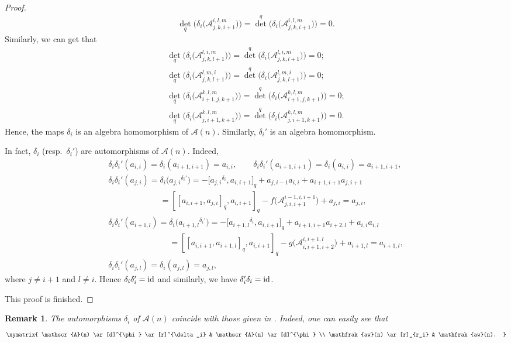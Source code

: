 \documentclass[10pt,a4paper]{amsart}
\numberwithin{equation}{section}
\def\id{{\rm id}}
\def\lr#1{\left[#1\right]}
\def\lrb#1{\left(#1\right)}
\def\d{\delta}
\def\A{\mathscr{A}}
\def\aw{\mathfrak{aw}}
\newtheorem{remark}{Remark}
\begin{document}
\begin{proof}
\begin{gather*}
{\det}_q \bigl(\d_i \bigl(\A_{j,k,i+1}^{i,l,m} \bigr) \bigr) ={\det}^q \bigl(\d_i \bigl(\A_{j,k,i+1}^{i,l,m} \bigr) \bigr)=0.
\end{gather*}
Similarly, we can get that
\begin{gather*}
{\det}_q \bigl(\d_i \bigl(\A_{j,k,l+1}^{l,i,m} \bigr) \bigr) ={\det}^q \bigl(\d_i \bigl(\A_{j,k,l+1}^{l,i,m} \bigr) \bigr)=0;\\
{\det}_q \bigl(\d_i \bigl(\A_{j,k,l+1}^{l, m, i} \bigr) \bigr) ={\det}^q \bigl(\d_i \bigl(\A_{j,k,l+1}^{l, m, i} \bigr) \bigr)=0;\\
{\det}_q \bigl(\d_i \bigl(\A_{i+1,j,k+1}^{k,l,m} \bigr) \bigr) ={\det}^q \bigl(\d_i \bigl(\A_{i+1,j,k+1}^{k,l,m} \bigr) \bigr)=0;\\
{\det}_q \bigl(\d_i \bigl(\A_{j,i+1,k+1}^{k,l,m} \bigr) \bigr) ={\det}^q \bigl(\d_i \bigl(\A_{j,i+1,k+1}^{k,l,m} \bigr) \bigr)=0.
\end{gather*}
Hence, the maps $\d_i$ is an algebra homomorphism of $\A(n)$.
Similarly, $\d_i'$ is an algebra homomorphism.

In fact, $\d_i$ (resp.\ $\d_i'$) are automorphisms of $\A(n)$.
Indeed,
\begin{gather*}
\d_i\d_i'\lrb{a_{i,i}} = \d_i\lrb{a_{i+1,i+1}}=a_{i,i},\qquad
\d_i\d_i'\lrb{a_{i+1,i+1}} = \d_i\lrb{a_{i,i}}=a_{i+1,i+1},\\
\d_i\d_i'\lrb{a_{j,i}} = \d_i\bigl({a_{j,i}}^{\d_i'}\bigr)
 = -\bigl[{a_{j,i}}^{\d_i}, a_{i,i+1}\bigr]_q+a_{j,i-1}a_{i,i}+a_{i+1,i+1}a_{j,i+1}\\
\phantom{\d_i\d_i'\lrb{a_{j,i}} = }{} = [\lr{a_{i,i+1}, a_{j,i}}_q, a_{i,i+1}]_q-f\bigl(\A_{j,i,i+1}^{i-1,i,i+1}\bigr)+a_{j,i}
 = a_{j,i},\\
\d_i\d_i'\lrb{a_{i+1,l}} = \d_i\bigl({a_{i+1,l}}^{\d_i'}\bigr)
 = -\bigl[{a_{i+1,l}}^{\d_i} , a_{i,i+1}\bigr]_q+a_{i+1,i+1}a_{i+2,l}+a_{i,i}a_{i,l}\\
\phantom{\d_i\d_i'\lrb{a_{i+1,l}} =}{} = [\lr{a_{i,i+1}, a_{i+1,l}}_q, a_{i,i+1}]_q -g\bigl(\A_{i,i+1,i+2}^{i,i+1,l}\bigr)+a_{i+1,l}
 = a_{i+1,l},\\
\d_i\d_i'\lrb{a_{j,l}} = \d_i\lrb{a_{j,l}}=a_{j,l},
\end{gather*}
where $j \neq i+1$ and $l \neq i$.
Hence $\d_i\d_i'=\id$ and similarly, we have $\d_i'\d_i=\id$.

This proof is finished.
\end{proof}

\begin{remark}
The automorphisms $\d_i$ of $\A(n)$ coincide with those given in
{\rm\cite{CFPR(2023)}}. Indeed, one can easily see that
\begin{equation*}
\xymatrix{
 \A(n) \ar[d]^{\phi} \ar[r]^{\d_i}
 & \A(n) \ar[d]^{\phi} \\
 \aw(n) \ar[r]_{r_i}
 & \aw(n).
}
\end{equation*}
\end{remark}
\end{document}
